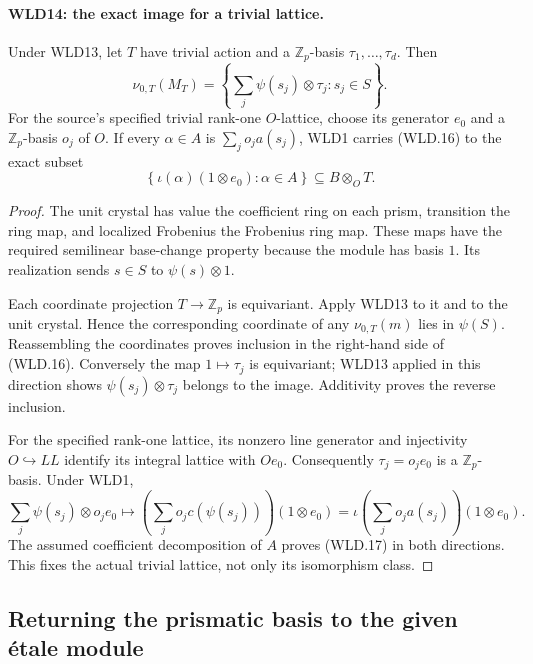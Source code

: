 \documentclass[11pt,a4paper]{article}
\numberwithin{equation}{section}
\theoremstyle{remark}\newtheorem{remark}[theorem]{Remark}
\begin{document}
\paragraph{WLD14: the exact image for a trivial lattice.}
\label{claim:WLD14}
Under WLD13, let $T$ have trivial action and a
$\mathbb Z_p$-basis $\tau_1,\ldots,\tau_d$. Then
\[
 \nu_{0,T}(M_T)
       =\left\{\sum_j\psi(s_j)\otimes\tau_j:s_j\in S\right\}.
                                                               \tag{WLD.16}
\]
For the source's specified trivial rank-one $O$-lattice,
choose its generator $e_0$ and a $\mathbb Z_p$-basis $o_j$ of $O$.
If every $\alpha\in A$ is $\sum_j o_ja(s_j)$, WLD1 carries
(WLD.16) to the exact subset
\[
      \left\{\iota(\alpha)(1\otimes e_0):\alpha\in A\right\}
                   \subseteq B\otimes_OT.                 \tag{WLD.17}
\]

\begin{proof}
The unit crystal has value the coefficient ring on each prism,
transition the ring map, and localized Frobenius the Frobenius
ring map. These maps have the required semilinear base-change
property because the module has basis $1$. Its realization sends
$s\in S$ to $\psi(s)\otimes1$.

Each coordinate projection $T\to\mathbb Z_p$ is equivariant.
Apply WLD13 to it and to the unit crystal. Hence the corresponding
coordinate of any $\nu_{0,T}(m)$ lies in $\psi(S)$. Reassembling
the coordinates proves inclusion in the right-hand side of
(WLD.16). Conversely the map $1\mapsto\tau_j$ is equivariant;
WLD13 applied in this direction shows
$\psi(s_j)\otimes\tau_j$ belongs to the image. Additivity proves
the reverse inclusion.

For the specified rank-one lattice, its nonzero line generator and
injectivity $O\hookrightarrow LL$ identify its integral lattice
with $Oe_0$. Consequently $\tau_j=o_je_0$ is a
$\mathbb Z_p$-basis. Under WLD1,
\[
 \sum_j\psi(s_j)\otimes o_je_0
       \longmapsto
       \left(\sum_j o_jc(\psi(s_j))\right)(1\otimes e_0)
       =\iota\left(\sum_j o_ja(s_j)\right)(1\otimes e_0).
\]
The assumed coefficient decomposition of $A$ proves (WLD.17)
in both directions. This fixes the actual trivial lattice, not
only its isomorphism class.
\end{proof}

\subsection{Returning the prismatic basis to the given \'etale module}
\end{document}

